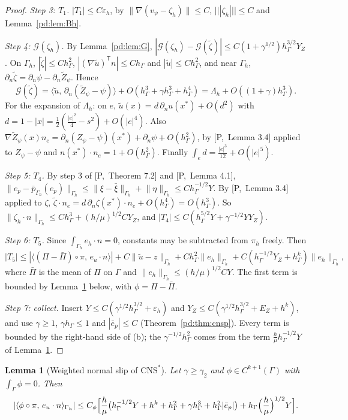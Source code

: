 \documentclass[11pt,reqno]{amsart}
\theoremstyle{plain}
\newtheorem{lemma}[theorem]{Lemma}
\theoremstyle{definition}
\newcommand{\hG}{h_\Gamma}
\newcommand{\Gh}{\Gamma_h}
\newcommand{\dn}{\partial_n}
\newcommand{\ut}{\tilde u}
\newcommand{\pbar}{\bar p}
\newcommand{\ip}[2]{\langle #1,\, #2\rangle}
\newcommand{\tnorm}[1]{|\!|\!|#1|\!|\!|}
\newcommand{\norm}[1]{\lVert #1\rVert}
\newcommand{\CNS}{\mathrm{CNS}^\ast}
\newcommand{\eps}{\varepsilon_h}
\newcommand{\Gc}{\mathcal G}
\newcommand{\Pref}[1]{\textup{[P,~#1]}}
\begin{document}
\begin{proof}
\emph{Step 3: $T_1$.} $|T_1|\le C\eps$, by $\norm{\nabla(v_\psi-\zeta_h)}\le C$, $\tnorm{\zeta_h}\le C$ and Lemma~\ref{pd:lem:Bh}.

\emph{Step 4: $\Gc(\zeta_h)$.} By Lemma~\ref{pd:lem:G}, $|\Gc(\zeta_h)-\Gc(\tilde\zeta)|\le C(1+\gamma^{1/2})\hG^{3/2}Y_Z$. On $\Gh$, $|\tilde\zeta|\le C\hG^2$, $|(\nabla\ut)^{\mathsf T}n|\le C\hG$ and $|\ut|\le C\hG^2$, and near $\Gh$, $\dn\tilde\zeta=\dn\psi-\dn\tilde Z_\psi$. Hence
\[
\Gc(\tilde\zeta)=\ip\ut{\dn(\tilde Z_\psi-\psi)}+O(\hG^3+\gamma\hG^3+\hG^4)=\Lambda_h+O((1+\gamma)\hG^3).
\]
For the expansion of $\Lambda_h$: on $e$, $\ut(x)=d\,\dn u(x^\ast)+O(d^2)$ with $d=1-|x|=\frac12(\frac{|e|^2}4-s^2)+O(|e|^4)$. Also $\nabla\tilde Z_\psi(x)n_e=\dn(Z_\psi-\psi)(x^\ast)+\dn\psi+O(\hG^2)$, by \Pref{Lemma 3.4} applied to $Z_\psi-\psi$ and $n(x^\ast)\cdot n_e=1+O(\hG^2)$. Finally $\int_ed=\frac{|e|^3}{12}+O(|e|^5)$.

\emph{Step 5: $T_4$.} By step 3 of \Pref{Theorem 7.2} and \Pref{Lemma 4.1}, $\norm{e_p-\pbar_{\Gh}(e_p)}_{\Gh}\le\norm{\xi-\bar\xi}_{\Gh}+\norm\eta_{\Gh}\le C\hG^{-1/2}Y$. By \Pref{Lemma 3.4} applied to $\zeta$, $\tilde\zeta\cdot n_e=d\,\dn\zeta(x^\ast)\cdot n_e+O(\hG^4)=O(\hG^3)$. So $\norm{\zeta_h\cdot n}_{\Gh}\le C\hG^3+(h/\mu)^{1/2}CY_Z$, and $|T_4|\le C(\hG^{5/2}Y+\gamma^{-1/2}YY_Z)$.

\emph{Step 6: $T_5$.} Since $\int_{\Gh}e_h\cdot n=0$, constants may be subtracted from $\pi_h$ freely. Then
\[
|T_5|\le|\ip{(\Pi-\bar\Pi)\circ\pi}{e_u\cdot n}|+C\norm{\ut-z}_{\Gh}+C\hG^2\norm{e_h}_{\Gh}+C(\hG^{-1/2}Y_Z+\hG^k)\norm{e_h}_{\Gh},
\]
where $\bar\Pi$ is the mean of $\Pi$ on $\Gamma$ and $\norm{e_h}_{\Gh}\le(h/\mu)^{1/2}CY$. The first term is bounded by Lemma~\ref{pd:lem:slip} below, with $\phi=\Pi-\bar\Pi$.

\emph{Step 7: collect.} Insert $Y\le C(\gamma^{1/2}\hG^{3/2}+\eps)$ and $Y_Z\le C(\gamma^{1/2}\hG^{3/2}+E_Z+h^k)$, and use $\gamma\ge1$, $\gamma\hG\le1$ and $|\bar e_p|\le C$ (Theorem~\ref{pd:thm:cnsp}). Every term is bounded by the right-hand side of (b); the $\gamma^{-1/2}\hG^2$ comes from the term $\frac h\mu\hG^{-1/2}Y$ of Lemma~\ref{pd:lem:slip}.
\end{proof}

\begin{lemma}[Weighted normal slip of $\CNS$]\label{pd:lem:slip}
Let $\gamma\ge\gamma_2$ and $\phi\in C^{k+1}(\Gamma)$ with $\int_\Gamma\phi=0$. Then
\[
|\ip{\phi\circ\pi}{e_u\cdot n}_{\Gh}|\le C_\phi\Bigl[\frac h\mu\bigl(\hG^{-1/2}Y+h^k+\hG^2+\gamma\hG^3+\hG^2|\bar e_p|\bigr)+\hG\Bigl(\frac h\mu\Bigr)^{1/2}Y\Bigr].
\]
\end{lemma}
\end{document}
